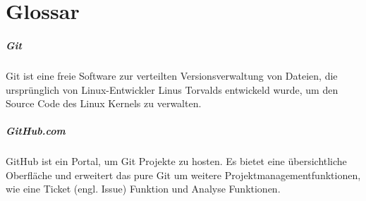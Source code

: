 \documentclass[11pt]{scrreprt}
\begin{document}
\chapter{Glossar}
\paragraph{Git} Git ist eine freie Software zur verteilten Versionsverwaltung von Dateien, die ursprünglich von Linux-Entwickler Linus Torvalds entwickeld wurde, um den Source Code des Linux Kernels zu verwalten.

\paragraph{GitHub.com} GitHub ist ein Portal, um Git Projekte zu hosten. Es bietet eine übersichtliche Oberfläche und erweitert das pure Git um weitere Projektmanagementfunktionen, wie eine Ticket (engl. Issue) Funktion und Analyse Funktionen.
\end{document}
